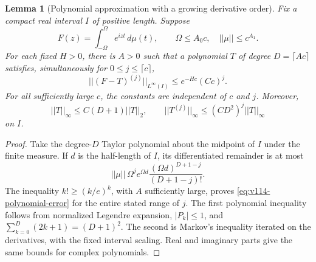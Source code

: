 \documentclass[11pt]{article}
\def\norm#1{||#1||}%
\newtheorem{lemma}[theorem]{Lemma}
\theoremstyle{remark}
\newcommand{\norm}[1]{\left\lVert #1\right\rVert}
\begin{document}
\begin{lemma}[Polynomial approximation with a growing derivative order]
\label{lem:v114-entire-polynomial}
Fix a compact real interval $I$ of positive length. Suppose
\[
 F(z)=\int_{-\Omega}^{\Omega}e^{izt}\,d\mu(t),\qquad
 \Omega\le A_0c,\quad \norm\mu\le c^{A_1}.
\]
For each fixed $H>0$, there is $A>0$ such that a polynomial $T$ of degree
$D=\lceil Ac\rceil$ satisfies, simultaneously for $0\le j\le\lceil c\rceil$,
\begin{equation}\label{eq:v114-polynomial-error}
 \norm{(F-T)^{(j)}}_{L^\infty(I)}
       \le e^{-Hc}(Cc)^j.
\end{equation}
For all sufficiently large $c$, the constants are independent of $c$ and $j$. Moreover,
\[
 \norm T_\infty\le C(D+1)\norm T_2,\qquad
 \norm{T^{(j)}}_\infty\le(CD^2)^j\norm T_\infty
\]
on $I$.
\end{lemma}
\begin{proof}
Take the degree-$D$ Taylor polynomial about the midpoint of $I$ under the
finite measure. If $d$ is the half-length of $I$, its differentiated
remainder is at most
\[
 \norm\mu\,\Omega^j e^{\Omega d}
       \frac{(\Omega d)^{D+1-j}}{(D+1-j)!}.
\]
The inequality $k!\ge(k/e)^k$, with $A$ sufficiently large, proves
\eqref{eq:v114-polynomial-error} for the entire stated range of $j$.
The first polynomial inequality follows from normalized Legendre expansion,
$|P_k|\le1$, and $\sum_{k=0}^D(2k+1)=(D+1)^2$. The second is Markov's
inequality iterated on the derivatives, with the fixed interval scaling.
Real and imaginary parts give the same bounds for complex polynomials.
\end{proof}
\end{document}
